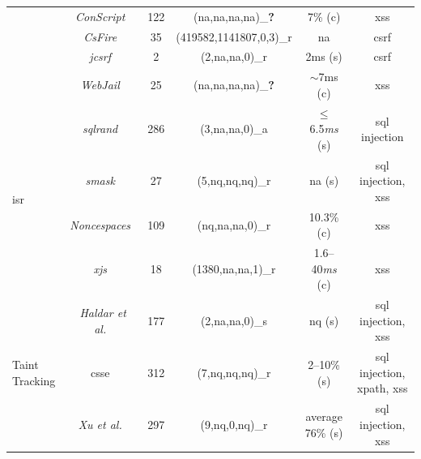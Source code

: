 \documentclass[conference]{IEEEtran}
\newcommand{\tick}{\ding{52}}
\newcommand{\xmark}{\ding{56}}
\begin{document}
\begin{landscape}
\begin{table}
\begin{threeparttable}
\begin{small}
{\begin{tabular}{l|c|c|cc|c}
  &   {\it ConScript}~\cite{ML10} & 122 & ({\sc na},{\sc na},{\sc na},{\sc na})\_{\bf ?} & 7\% ({\sc c}) & {\sc xss} \\
  &   {\it CsFire}~\cite{DDHPJ10} & 35 & (419582,1141807,0,3)\_r\tnote{4} & {\sc na} & {\sc csrf} \\
  &   {\it j{\sc csrf}}~\cite{PS11} & 2 & (2,{\sc na},{\sc na},0)\_r & 2ms ({\sc s}) & {\sc csrf} \\
  &   {\it WebJail}~\cite{VDDPJ11} & 25 & ({\sc na},{\sc na},{\sc na},{\sc na})\_{\bf ?} & $\sim$7ms ({\sc c}) & {\sc xss} \\
  \hline
  \hline
  \multirow{4}{*}{{\sc isr}}
  &   {\it {\sc sql}rand}~\cite{BK04} & 286 & (3,{\sc na},{\sc na},0)\_a & $\le$6.5{\it ms} ({\sc s}) & {\sc sql} injection \\
  &   {\it {\sc sm}ask}~\cite{JB07} & 27 & (5,{\sc nq},{\sc nq},{\sc nq})\_r  & {\sc na} ({\sc s}) & {\sc sql} injection, {\sc xss} \\
  &   {\it Noncespaces}~\cite{GC09} & 109 & ({\sc nq},{\sc na},{\sc na},0)\_r &  10.3\% ({\sc c}) & {\sc xss} \\ 
  &   {\it x{\sc js}}~\cite{APKLM10} & 18 & (1380,{\sc na},{\sc na},1)\_r & 1.6--40{\it ms} ({\sc c}) & {\sc xss} \\
  \hline
  \hline
	\multirow{7}{*}{Taint Tracking}
  &   {\it Haldar et al.}~\cite{HCF05} & 177 & (2,{\sc na},{\sc na},0)\_s & {\sc nq} ({\sc s}) & {\sc sql} injection, {\sc xss} \\ 
	&  	{\sc csse}~\cite{PB05} & 312 & (7,{\sc nq},{\sc nq},{\sc nq})\_r & 2--10\% ({\sc s}) & {\sc sql} injection, {\sc xp}ath, {\sc xss} \\
	&  	{\it Xu et al.}~\cite{XBS06} & 297 & (9,{\sc nq},0,{\sc nq})\_r & average 76\% ({\sc s}) & {\sc sql} injection, {\sc xss} \\ 

\end{tabular}}
\end{small}
\end{threeparttable}
\end{table}
\end{landscape}
\end{document}
